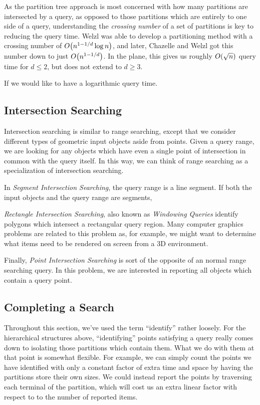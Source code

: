 As the partition tree approach is most concerned with how many partitions are intersected by a query, as opposed to those partitions which are entirely to one side of a query, understanding the \emph{crossing number} of a set of partitions is key to reducing the query time.
Welzl\cite{W} was able to develop a partitioning method with a crossing number of $O\!\left(n^{1-1/d}\log{n}\right)$, and later, Chazelle and Welzl\cite{CW} got this number down to just $O\!\left(n^{1-1/d}\right)$.
In the plane, this gives us roughly $O\!\left(\sqrt{n}\right)$ query time for $d \leq 2$, but does not extend to $d \geq 3$.

If we would like to have a logarithmic query time.


\subsection*{Intersection Searching} 

Intersection searching is similar to range searching, except that we consider different types of geometric input objects aside from points.
Given a query range, we are looking for any objects which have even a single point of intersection in common with the query itself.
In this way, we can think of range searching as a specialization of intersection searching.

In \emph{Segment Intersection Searching}, the query range is a line segment. 
If both the input objects and the query range are segments, 

\emph{Rectangle Intersection Searching}, also known as \emph{Windowing Queries} identify polygons which intersect a rectangular query region. 
Many computer graphics problems are related to this problem as, for example, we might want to determine what items need to be rendered on screen from a 3D environment.

Finally, \emph{Point Intersection Searching} is sort of the opposite of an normal range searching query. In this problem, we are interested in reporting all objects which contain a query point.


\subsection*{Completing a Search}

Throughout this section, we've used the term ``identify'' rather loosely.
For the hierarchical structures above, ``identifying'' points satisfying a query really comes down to isolating those partitions which contain them.
What we do with them at that point is somewhat flexible.
For example, we can simply count the points we have identified with only a constant factor of extra time and space by having the partitions store their own sizes.
We could instead report the points by traversing each terminal of the partition, which will cost us an extra linear factor with respect to to the number of reported items.

